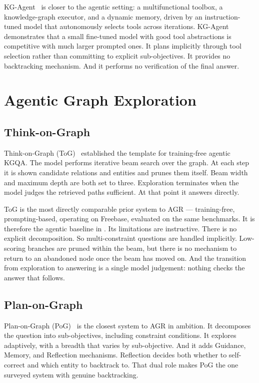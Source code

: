 KG-Agent~\cite{jiang2024kgagent} is closer to the agentic setting: a
multifunctional toolbox, a knowledge-graph executor, and a dynamic memory,
driven by an instruction-tuned model that autonomously selects tools across
iterations. KG-Agent demonstrates that a small fine-tuned model with good tool
abstractions is competitive with much larger prompted ones. It plans implicitly
through tool selection rather than committing to explicit sub-objectives. It
provides no backtracking mechanism. And it performs no verification of the
final answer.

\section{Agentic Graph Exploration}\label{sec:agentic-exploration}

\subsection{Think-on-Graph}

Think-on-Graph (ToG)~\cite{sun2024think} established the template
for training-free agentic KGQA. The model performs
iterative beam search over the graph. At each step it is shown candidate
relations and entities and prunes them itself. Beam width and maximum depth are
both set to three. Exploration terminates when the model judges the retrieved
paths sufficient. At that point it answers directly.

ToG is the most directly comparable prior system to AGR --- training-free,
prompting-based, operating on Freebase, evaluated on the same benchmarks. It is
therefore the agentic baseline in . Its limitations are
instructive. There is no explicit decomposition. So multi-constraint questions
are handled implicitly. Low-scoring branches are pruned within the beam, but
there is no mechanism to return to an abandoned node once the beam has moved on.
And the transition from exploration to answering is a single model judgement:
nothing checks the answer that follows.

\subsection{Plan-on-Graph}

Plan-on-Graph (PoG)~\cite{chen2024plan} is the closest system to AGR in
ambition. It decomposes the question into sub-objectives, including constraint
conditions. It explores adaptively, with a breadth that varies by sub-objective.
And it adds Guidance, Memory, and Reflection mechanisms. Reflection decides
both whether to self-correct and which entity to backtrack to. That dual role
makes PoG the one surveyed system with genuine backtracking.


